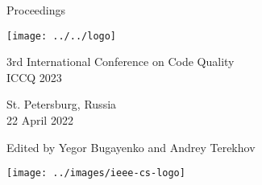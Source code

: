 \thispagestyle{empty}
\begin{center}
Proceedings

\vspace{1in}

\texttt{[image: ../../logo]}

\vspace{0.5in}

{\Large 3rd International Conference on Code Quality\\[12pt]
ICCQ 2023}

\vspace{0.5in}

St. Petersburg, Russia\\
22 April 2022

\vspace{0.5in}

Edited by Yegor Bugayenko and Andrey Terekhov

\vspace{1.5in}




\texttt{[image: ../images/ieee-cs-logo]}

\end{center}

